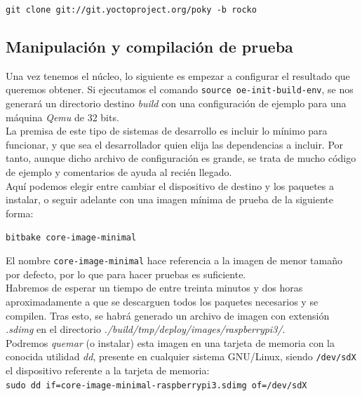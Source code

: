 \begin{center}
\texttt{git clone git://git.yoctoproject.org/poky -b rocko}
\end{center}

\subsection{Manipulación y compilación de prueba}

Una vez tenemos el núcleo, lo siguiente es empezar a configurar el resultado que queremos obtener. Si ejecutamos el comando \texttt{source oe-init-build-env}, se nos generará un directorio destino \textit{build} con una configuración de ejemplo para una máquina \textit{Qemu} de 32 bits.\\ 

La premisa de este tipo de sistemas de desarrollo es incluir lo mínimo para funcionar, y que sea el desarrollador quien elija las dependencias a incluir. Por tanto, aunque dicho archivo de configuración es grande, se trata de mucho código de ejemplo y comentarios de ayuda al recién llegado.\\

Aquí podemos elegir entre cambiar el dispositivo de destino y los paquetes a instalar, o seguir adelante con una imagen mínima de prueba de la siguiente forma:

\begin{center}
\texttt{bitbake core-image-minimal}
\end{center}

El nombre \texttt{core-image-minimal} hace referencia a la imagen de menor tamaño por defecto, por lo que para hacer pruebas es suficiente. \\

Habremos de esperar un tiempo de entre treinta minutos y dos horas aproximadamente a que se descarguen todos los paquetes necesarios y se compilen. Tras esto, se habrá generado un archivo de imagen con extensión \textit{.sdimg} en el directorio \textit{./build/tmp/deploy/images/raspberrypi3/}.\\

Podremos \textit{quemar} (o instalar) esta imagen en una tarjeta de memoria con la conocida utilidad \textit{dd}, presente en cualquier sistema GNU/Linux, siendo \texttt{/dev/sdX} el dispositivo referente a la tarjeta de memoria:\\

\texttt{sudo dd if=core-image-minimal-raspberrypi3.sdimg of=/dev/sdX}\\

